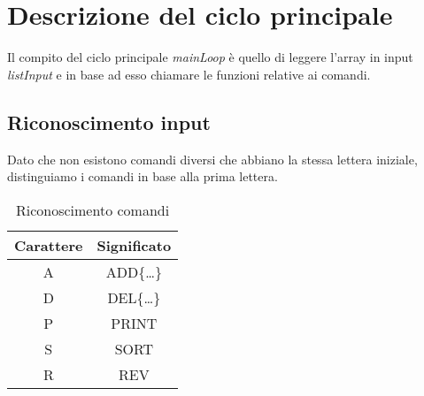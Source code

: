 \section{Descrizione del ciclo principale}

Il compito del ciclo principale \textit{mainLoop} è quello di leggere 
l'array in input \textit{listInput} e in base ad esso chiamare le funzioni relative ai comandi.

\subsection{Riconoscimento input}
Dato che non esistono comandi diversi che abbiano la stessa lettera iniziale,
distinguiamo i comandi in base alla prima lettera.
\\
\begin{table}[H]
\begin{center}
\begin{tabular}{|c|c|}
    \hline
    Carattere & Significato \\
    \hline
    A & ADD\{\ldots\} \\
    \hline
    D & DEL\{\ldots\} \\
    \hline
    P & PRINT \\
    \hline
    S & SORT \\
    \hline
    R & REV \\
    \hline
\end{tabular}
\caption{Riconoscimento comandi}
\label{tab:commandIdentification}
\end{center}
\end{table}

